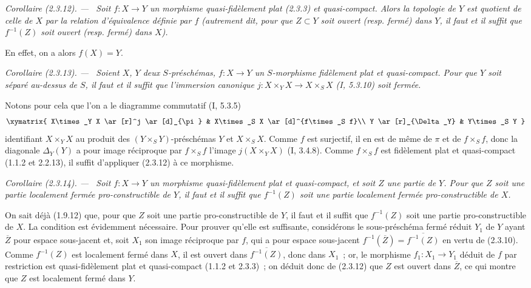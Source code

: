 \documentclass[10pt,oneside]{book}
\newenvironment{corollary}[1][]{%
  \par\medskip\noindent\itshape Corollaire (#1). ---\ }{\par}
\begin{document}
\begin{corollary}[2.3.12]
\label{IV.2.3.12-fr}
Soit $f:X\to Y$ un morphisme quasi-fidèlement plat (2.3.3) et quasi-compact.
Alors la topologie de $Y$ est quotient de celle de $X$ par la relation
d'équivalence définie par $f$ (autrement dit, pour que $Z\subset Y$ soit
ouvert (resp. fermé) dans $Y$, il faut et il suffit que $f^{-1}(Z)$ soit
ouvert (resp. fermé) dans $X$).
\end{corollary}

En effet, on a alors $f(X)=Y$.

\begin{corollary}[2.3.13]
\label{IV.2.3.13-fr}
Soient $X$, $Y$ deux $S$-préschémas, $f:X\to Y$ un $S$-morphisme fidèlement
plat et quasi-compact. Pour que $Y$ soit séparé au-dessus de $S$, il faut et il
suffit que l'immersion canonique
$j:X\times_Y X\to X\times_S X$ (I, 5.3.10) soit \emph{fermée}.
\end{corollary}

Notons pour cela que l'on a le diagramme commutatif (I, 5.3.5)
\[
\xymatrix{
  X\times_Y X \ar[r]^j \ar[d]_{\pi} &
  X\times_S X \ar[d]^{f\times_S f}\\
  Y \ar[r]_{\Delta_Y} & Y\times_S Y
}
\]
identifiant $X\times_Y X$ au produit des $(Y\times_S Y)$-préschémas $Y$ et
$X\times_S X$. Comme $f$ est surjectif, il en est de même de $\pi$ et de
$f\times_S f$, donc la diagonale $\Delta_Y(Y)$ a pour image réciproque par
$f\times_S f$ l'image $j(X\times_Y X)$ (I, 3.4.8). Comme $f\times_S f$ est
fidèlement plat et quasi-compact (1.1.2 et 2.2.13), il suffit d'appliquer
(2.3.12) à ce morphisme.

\begin{corollary}[2.3.14]
\label{IV.2.3.14-fr}
Soit $f:X\to Y$ un morphisme quasi-fidèlement plat et quasi-compact, et soit
$Z$ une partie de $Y$. Pour que $Z$ soit une partie localement fermée
pro-constructible de $Y$, il faut et il suffit que $f^{-1}(Z)$ soit une partie
localement fermée pro-constructible de $X$.
\end{corollary}

On sait déjà (1.9.12) que, pour que $Z$ soit une partie pro-constructible de
$Y$, il faut et il suffit que $f^{-1}(Z)$ soit une partie pro-constructible de
$X$. La condition est évidemment nécessaire. Pour prouver qu'elle est
suffisante, considérons le sous-préschéma fermé réduit $Y_1$ de $Y$ ayant
$\overline Z$ pour espace sous-jacent et, soit $X_1$ son image réciproque par
$f$, qui a pour espace sous-jacent
$f^{-1}(\overline Z)=\overline{f^{-1}(Z)}$ en vertu de (2.3.10). Comme
$f^{-1}(Z)$ est localement fermé dans $X$, il est ouvert dans
$\overline{f^{-1}(Z)}$, donc dans $X_1$~; or, le morphisme $f_1:X_1\to Y_1$
déduit de $f$ par restriction est quasi-fidèlement plat et quasi-compact
(1.1.2 et 2.3.3)~; on déduit donc de (2.3.12) que $Z$ est ouvert dans
$\overline Z$, ce qui montre que $Z$ est localement fermé dans $Y$.
\end{document}
